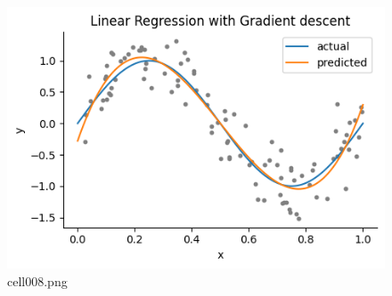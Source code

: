 \begin{figure}[ht]
	\centering
	\includegraphics[scale=0.8, max width=\linewidth]{./fig/introduction/linear-regression/cell008.png}
	\caption{cell008.png}
	\label{cell008.png}
\end{figure}